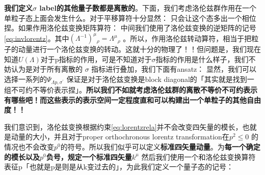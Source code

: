 \textbf{我们定义$ \sigma $ label的其他量子数都是离散的}。下面，我们考虑洛伦兹群作用在一个单粒子态上面会发生什么。对于平移算符十分显然：
只会让这个态多出一个相位捏。如果作用洛伦兹变换矩阵算符：
中间我们使用了洛伦兹变换的逆矩阵的记号\cref{eq:invlorentz}。其中$ (\Lambda^{-1})^{\mu}{}_\rho =  \Lambda^{\mu}{}_{\rho}$ 。所以，作用洛伦兹转动算符，相当于把粒子的动量进行一个洛伦兹变换的转动。这就十分的物理了！！但问题是，我们现在知道$ U(\Lambda) $对于p指标的作用，可是不知道对于$ \sigma $指标的作用是什么样子，我们不妨认为是对于所有离散的 $ \sigma $ 指标进行叠加，我们下面有ansatz：
显然，我们可以选择一系列的$ \Psi_{\Lambda p,\sigma^{\prime}} $ 保证是对于洛伦兹变换是block diagonal的「其实就是找到一组不可约不等价表示捏」。\textbf{所以我们不如就考虑洛伦兹群的离散不等价不可约表示有哪些吧！而这些表示的表示空间一定程度直和可以构建出一个单粒子的其他自由度！！}

我们意识到，洛伦兹变换根据约束\cref{eq:lorentzrela}并不会改变四矢量的模长，也就是动量的大小，并且对于proper orthochronous lorentz transformation在$ p^2 \leq 0 $ 的情况也不会改变$ p^0 $的符号。所以我们似乎可以定义\textbf{标准四矢量动量}。为\textbf{每一个确定的模长以及$ p^0 $负号，规定一个标准四矢量$ k^\mu $  } 然后我们使用一个和洛伦兹变换算符表征p「也就是p是则是从k变过去的」，为此我们定义一个量子态的记号：

